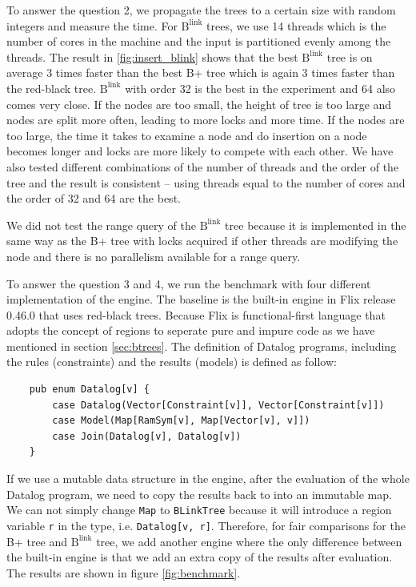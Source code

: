 \documentclass[11pt]{report}
\theoremstyle{definition}
\begin{document}
To answer the question 2, we propagate the trees to a certain size with random integers and measure the time. For $\text{B}^{\text{link}}$ trees, we use 14 threads which is the number of cores in the machine and the input is partitioned evenly among the threads. The result in \ref{fig:insert_blink} shows that the best $\text{B}^{\text{link}}$ tree is on average 3 times faster than the best B+ tree which is again 3 times faster than the red-black tree. $\text{B}^{\text{link}}$ with order 32 is the best in the experiment and 64 also comes very close. If the nodes are too small, the height of tree is too large and nodes are split more often, leading to more locks and more time. If the nodes are too large, the time it takes to examine a node and do insertion on a node becomes longer and locks are more likely to compete with each other. We have also tested different combinations of the number of threads and the order of the tree and the result is consistent -- using threads equal to the number of cores and the order of 32 and 64 are the best.

We did not test the range query of the $\text{B}^{\text{link}}$ tree because it is implemented in the same way as the B+ tree with locks acquired if other threads are modifying the node and there is no parallelism available for a range query.

To answer the question 3 and 4, we run the benchmark with four different implementation of the engine. The baseline is the built-in engine in Flix release 0.46.0 that uses red-black trees. Because Flix is functional-first language that adopts the concept of regions to seperate pure and impure code as we have mentioned in section \ref{sec:btrees}. The definition of Datalog programs, including the rules (constraints) and the results (models) is defined as follow:
\begin{verbatim}
    pub enum Datalog[v] {
        case Datalog(Vector[Constraint[v]], Vector[Constraint[v]])
        case Model(Map[RamSym[v], Map[Vector[v], v]])
        case Join(Datalog[v], Datalog[v])
    }
\end{verbatim}

If we use a mutable data structure in the engine, after the evaluation of the whole Datalog program, we need to copy the results back to into an immutable map. We can not simply change \texttt{Map} to \texttt{BLinkTree} because it will introduce a region variable \texttt{r} in the type, i.e. \texttt{Datalog[v, r]}. Therefore, for fair comparisons for the B+ tree and $\text{B}^{\text{link}}$ tree, we add another engine where the only difference between the built-in engine is that we add an extra copy of the results after evaluation. The results are shown in figure \ref{fig:benchmark}.
\end{document}
